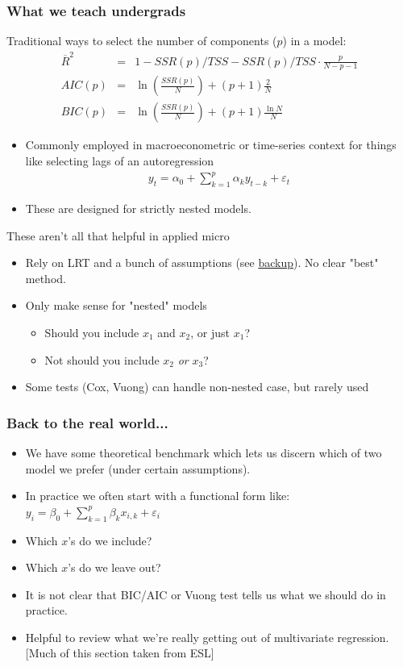 \begin{frame}
\frametitle{What we teach undergrads}
Traditional ways to select the number of components ($p$) in a model:\\
\begin{eqnarray*}
\overline{R}^2  &=& 1-SSR(p)/TSS - SSR(p)/TSS \cdot \frac{p}{N-p-1} \\
AIC(p) &=& \ln\left(\frac{SSR(p)}{N}\right) + (p+1)\frac{2}{N}\\
BIC(p) &=& \ln \left(\frac{SSR(p)}{N} \right) + (p+1)\frac{\ln N}{N}
\end{eqnarray*}
\begin{itemize}
\item Commonly employed in macroeconometric or time-series context for things like selecting lags of an autoregression
\begin{eqnarray*}
y_t = \alpha_0 + \sum_{k=1}^p \alpha_k y_{t-k} + \varepsilon_t
\end{eqnarray*}
\item These are designed for strictly \alert{nested} models.
\end{itemize}
\end{frame}

\begin{frame}{These aren't all that helpful in applied micro}
    \begin{itemize}
        \item Rely on LRT and a bunch of assumptions (see \hyperlink{sec:info}{backup}). No clear "best" method.
        \item Only make sense for "nested" models
        \begin{itemize}
            \item Should you include $x_1$ and $x_2$, or just $x_1$?
            \item Not should you include $x_2$ \textit{or} $x_3$?
        \end{itemize}
        \item Some tests (Cox, Vuong) can handle non-nested case, but rarely used
    \end{itemize}
\end{frame}

\begin{frame}
\frametitle{Back to the real world...}
\begin{itemize}
\item We have some theoretical benchmark which lets us discern which of two model we prefer (under certain assumptions).
\item In practice we often start with a functional form like:\\
 $y_i = \beta_0 + \sum_{k=1}^p \beta_k x_{i,k} + \varepsilon_{i}$
 \item Which $x$'s do we include?
 \item Which $x$'s do we leave out?
 \item It is not clear that BIC/AIC or Vuong test tells us what we should do in practice.
 \item Helpful to review what we're really getting out of multivariate regression. [Much of this section taken from ESL]
\end{itemize}
\end{frame}

